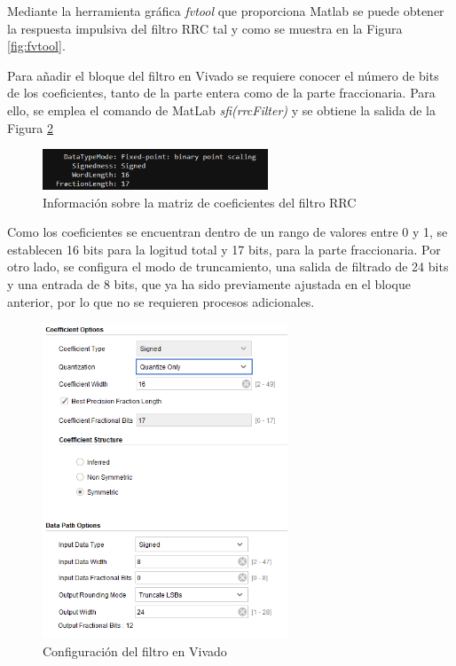 \vspace{3mm}

Mediante la herramienta gráfica \textit{fvtool} que proporciona Matlab se puede obtener la respuesta impulsiva del filtro RRC tal y como se muestra en la Figura \ref{fig:fvtool}.

\pagebreak

Para añadir el bloque del filtro en Vivado se requiere conocer el número de bits de los coeficientes, tanto de la parte entera como de la parte fraccionaria. Para ello, se emplea el comando de MatLab \textit{sfi(rrcFilter)} y se obtiene la salida de la Figura \ref{fig:fvtool2}

\vspace{3mm}

\begin{figure}[h]
	\centering
	\includegraphics[width=0.6\textwidth]{img/matlab/coefs.PNG}
	\caption{Información sobre la matriz de coeficientes del filtro RRC}
	\label{fig:fvtool2}
\end{figure}
    
\vspace{3mm}

Como los coeficientes se encuentran dentro de un rango de valores entre 0 y 1, se establecen 16 bits para la logitud total y 17 bits, para la parte fraccionaria. Por otro lado, se configura el modo de truncamiento, una salida de filtrado de 24 bits y una entrada de 8 bits, que ya ha sido previamente ajustada en el bloque anterior, por lo que no se requieren procesos adicionales.

\vspace{3mm}

\begin{figure}[h]
	\centering
	\includegraphics[width=0.65\textwidth]{img/diseno/fir.PNG}
	\caption{Configuración del filtro en Vivado}
	\label{fig:fvtool2}
\end{figure}
    
